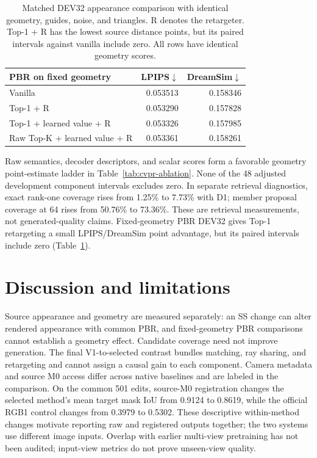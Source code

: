 \documentclass[10pt,twocolumn,letterpaper]{article}
\begin{document}
\begin{table}[t]
\centering\footnotesize
\setlength{\tabcolsep}{3pt}
\begin{tabular}{lrr}
\toprule
PBR on fixed geometry & LPIPS$\downarrow$ & DreamSim$\downarrow$\\
\midrule
Vanilla & 0.053513 & 0.158346\\
Top-1 + R & 0.053290 & 0.157828\\
Top-1 + learned value + R & 0.053326 & 0.157985\\
Raw Top-K + learned value + R & 0.053361 & 0.158261\\
\bottomrule
\end{tabular}
\caption{Matched DEV32 appearance comparison with identical geometry,
guides, noise, and triangles. R denotes the retargeter. Top-1 + R has the
lowest source distance points, but its paired intervals against vanilla
include zero. All rows have identical geometry scores.}
\label{tab:cvpr-pbr}
\end{table}

Raw semantics, decoder descriptors, and scalar scores form a favorable
geometry point-estimate ladder in Table~\ref{tab:cvpr-ablation}. None of the
48 adjusted development component intervals excludes zero. In separate
retrieval diagnostics, exact rank-one coverage rises from 1.25\% to 7.73\%
with D1; member proposal coverage at 64 rises from 50.76\% to 73.36\%.
These are retrieval measurements, not generated-quality claims. Fixed-geometry
PBR DEV32 gives Top-1 retargeting a small LPIPS/DreamSim point advantage,
but its paired intervals include zero (Table~\ref{tab:cvpr-pbr}).


\section{Discussion and limitations}
Source appearance and geometry are measured separately: an SS change can
alter rendered appearance with common PBR, and fixed-geometry PBR comparisons
cannot establish a geometry effect. Candidate coverage need not improve
generation. The final V1-to-selected contrast bundles matching, ray sharing,
and retargeting and cannot assign a causal gain to each component. Camera
metadata and source M0 access differ across native baselines and are labeled
in the comparison. On the common 501 edits, source-M0 registration changes
the selected method's mean target mask IoU from 0.9124 to 0.8619, while the
official RGB1 control changes from 0.3979 to 0.5302. These descriptive
within-method changes motivate reporting raw and registered outputs together;
the two systems use different image inputs. Overlap with earlier multi-view pretraining has not been
audited; input-view metrics do not prove unseen-view quality.
\end{document}
